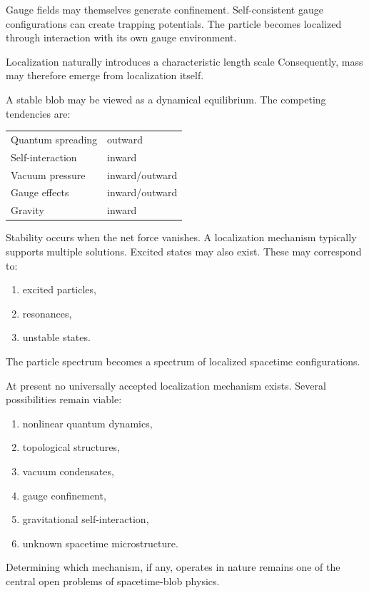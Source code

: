 Gauge fields may themselves generate confinement.
Self-consistent gauge configurations can create trapping potentials.
The particle becomes localized through interaction with its own gauge
environment.

Localization naturally introduces a characteristic length scale
Consequently,
mass may therefore emerge from localization itself.

A stable blob may be viewed as a dynamical equilibrium.
The competing tendencies are:
\begin{center}
\begin{tabular}{ll}
Quantum spreading & outward \\
Self-interaction & inward \\
Vacuum pressure & inward/outward \\
Gauge effects & inward/outward \\
Gravity & inward
\end{tabular}
\end{center}
Stability occurs when the net force vanishes.
A localization mechanism typically supports multiple solutions.
Excited states may also exist.
These may correspond to:
\begin{enumerate}
\item excited particles,
\item resonances,
\item unstable states.
\end{enumerate}
The particle spectrum becomes a spectrum of localized spacetime
configurations.

At present no universally accepted localization mechanism exists.
Several possibilities remain viable:
\begin{enumerate}
\item nonlinear quantum dynamics,
\item topological structures,
\item vacuum condensates,
\item gauge confinement,
\item gravitational self-interaction,
\item unknown spacetime microstructure.
\end{enumerate}
Determining which mechanism, if any, operates in nature remains one of
the central open problems of spacetime-blob physics.

